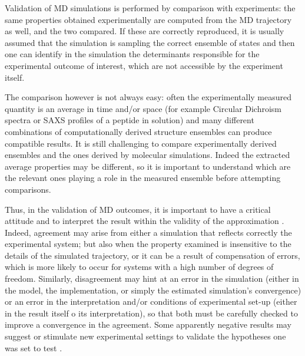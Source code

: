 Validation of MD simulations is performed by comparison with experiments: the same properties obtained experimentally are computed from the MD trajectory as well, and the two compared. If these are correctly reproduced, it is usually assumed that the simulation is sampling the correct ensemble of states and then one can identify in the simulation the determinants responsible for the experimental outcome of interest, which are not accessible by the experiment itself.

The comparison however is not always easy: often the experimentally measured quantity is an average in time and/or space (for example Circular Dichroism spectra or SAXS profiles of a peptide in solution) and many different combinations of computationally derived structure ensembles can produce compatible results. It is still challenging to compare experimentally derived ensembles and the ones derived by molecular simulations. Indeed the extracted average properties may be different, so it is important to understand which are the relevant ones playing a role in the measured ensemble before attempting comparisons.

Thus, in the validation of MD outcomes, it is important to have a critical attitude and to interpret the result within the validity of the approximation \cite{VanGunsteren2008}.
%
Indeed, agreement may arise from either a simulation that reflects correctly the experimental system; but also when the property examined is insensitive to the details of the simulated trajectory, or it can be a result of compensation of errors, which is more likely to  occur for systems with a high number of degrees of freedom.
%
Similarly, disagreement may hint at an error in the simulation (either in the model, the implementation, or simply the estimated simulation's convergence) or an error in the interpretation and/or conditions of experimental set-up (either in the result itself o its interpretation), so that both must be carefully checked to improve a convergence in the agreement.
%
Some apparently negative results may suggest or stimulate new experimental settings to validate the hypotheses one was set to test \cite{Goncalves2013,Meissner2014}.

